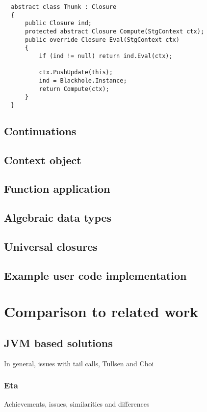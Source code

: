 \documentclass[en]{pracamgr}
\begin{document}
\begin{verbatim}
  abstract class Thunk : Closure
  {
      public Closure ind;
      protected abstract Closure Compute(StgContext ctx);
      public override Closure Eval(StgContext ctx)
      {
          if (ind != null) return ind.Eval(ctx);
  
          ctx.PushUpdate(this);
          ind = Blackhole.Instance;
          return Compute(ctx);
      }
  }
\end{verbatim}

\section{Continuations}

\section{Context object}

\section{Function application}

\section{Algebraic data types}

\section{Universal closures}

\section{Example user code implementation}


\chapter{Comparison to related work}\label{r:alternatives}

\section{JVM based solutions}
In general, issues with tail calls, Tullsen and Choi
\subsection{Eta}
Achievements, issues, similarities and differences
\end{document}

